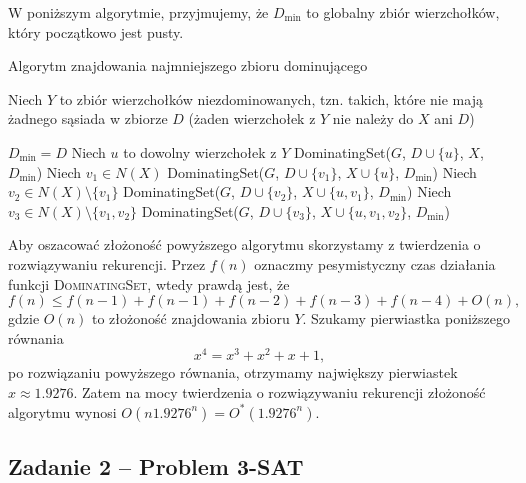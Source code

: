 W poniższym algorytmie, przyjmujemy, że $D_{\min}$ to globalny zbiór
wierzchołków, który początkowo jest pusty.
\begin{algorithm}[H]
	\caption{Algorytm znajdowania najmniejszego zbioru dominującego}
	\begin{algorithmic}[1]
		\State \Return
		\EndIf
		\State Niech $Y$ to zbiór wierzchołków niezdominowanych, tzn. takich, które nie mają żadnego sąsiada w zbiorze $D$ (żaden
		wierzchołek z $Y$ nie należy do $X$ ani $D$)		

		\State $D_{\min} = D$
		\EndIf
		\State \Return
		\EndIf
		\State Niech $u$ to dowolny wierzchołek z $Y$
		\State DominatingSet($G$, $D \cup \{u\}$, $X$, $D_{\min}$)
		\State Niech $v_1 \in N(X)$
		\State DominatingSet($G$, $D \cup \{v_1\}$, $X \cup \{u\}$, $D_{\min}$)
		\EndIf
		\EndIf
		\State Niech $v_2 \in N(X) \setminus \{v_1\}$
		\State DominatingSet($G$, $D \cup \{v_2\}$, $X \cup \{u, v_1\}$, $D_{\min}$)
		\EndIf
		\EndIf
		\State Niech $v_3 \in N(X) \setminus \{v_1, v_2\}$
		\State DominatingSet($G$, $D \cup \{v_3\}$, $X \cup \{u, v_1, v_2\}$, $D_{\min}$)
		\EndIf
		\EndIf
		\EndProcedure		
	\end{algorithmic}
\end{algorithm}

Aby oszacować złożoność powyższego algorytmu skorzystamy z 
twierdzenia o rozwiązywaniu rekurencji. Przez $f(n)$
oznaczmy pesymistyczny czas działania funkcji \textsc{DominatingSet},
wtedy prawdą jest, że
\[f(n) \leq f(n-1) + f(n-1) + f(n-2) + f(n-3) + f(n-4) + O(n),\]
gdzie $O(n)$ to złożoność znajdowania zbioru $Y$. 
Szukamy pierwiastka poniższego równania
\[x^4 = x^3 + x^2 + x + 1,\]
po rozwiązaniu powyższego równania, otrzymamy największy
pierwiastek $x \approx 1.9276$. Zatem na mocy twierdzenia
o rozwiązywaniu rekurencji złożoność algorytmu wynosi $O(n1.9276^n) = O^*(1.9276^n)$.

\subsection{Zadanie 2 -- Problem 3-SAT}

